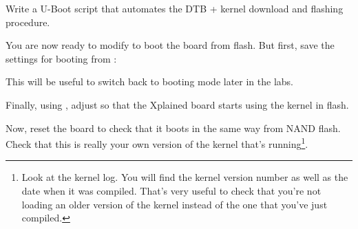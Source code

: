 Write a U-Boot script that automates the DTB + kernel download
and flashing procedure.

You are now ready to modify  to boot the board
from flash. But first, save the settings for booting from :


This will be useful to switch back to  booting mode
later in the labs.

Finally, using ,
adjust  so that the Xplained board starts
using the kernel in flash.

Now, reset the board to check that it boots
in the same way from NAND flash. Check that this is really your own version of
the kernel that's running\footnote{Look at the kernel log. You will find
the kernel version number as well as the date when it was compiled.
That's very useful to check that you're not loading an older version
of the kernel instead of the one that you've just compiled.}.

